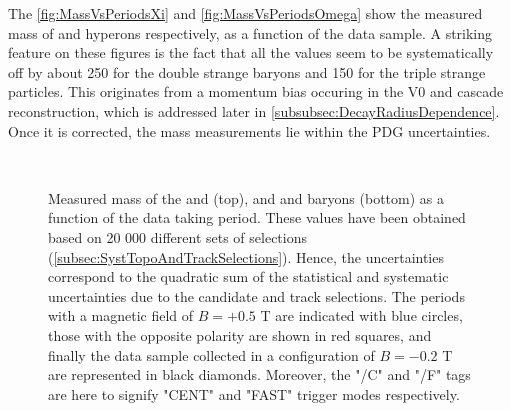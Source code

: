 The \figs\ref{fig:MassVsPeriodsXi} and \ref{fig:MassVsPeriodsOmega} show the measured mass of \rmXi and \rmOmega hyperons respectively, as a function of the data sample. A striking feature on these figures is the fact that all the values seem to be systematically off by about 250 \kmass for the double strange baryons and 150 \kmass for the triple strange particles. This originates from a momentum bias occuring in the V0 and cascade reconstruction, which is addressed later in \Sec\ref{subsubsec:DecayRadiusDependence}. Once it is corrected, the mass measurements lie within the PDG uncertainties.

\begin{landscape}
\begin{figure}[p]
\centering
 \\
\caption{Measured mass of the \rmXiM and \rmAxiP (top), and \rmOmegaM and \rmAomegaP baryons (bottom) as a function of the data taking period. These values have been obtained based on 20 000 different sets of selections (\Sec\ref{subsec:SystTopoAndTrackSelections}). Hence, the uncertainties correspond to the quadratic sum of the statistical and systematic uncertainties due to the candidate and track selections. The periods with a magnetic field of $B = +0.5$ T are indicated with blue circles, those with the opposite polarity are shown in red squares, and finally the data sample collected in a configuration of $B = -0.2$ T are represented in black diamonds. Moreover, the "/C" and "/F" tags are here to signify "CENT" and "FAST" trigger modes respectively.}
	\label{fig:MassVsPeriods}
\end{figure}
\end{landscape}

